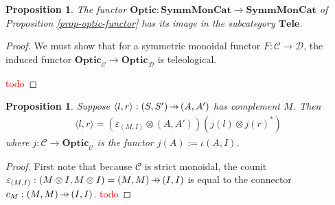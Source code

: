 \documentclass[11pt,a4paper]{article}
\theoremstyle{plain}
\newtheorem{proposition}[theorem]{Proposition}
\theoremstyle{definition}
\newcommand{\C}{\mathscr{C}}
\newcommand{\D}{\mathscr{D}}
\newcommand{\SymmMonCat}{\mathbf{SymmMonCat}}
\newcommand{\Tele}{\mathbf{Tele}}
\newcommand{\Optic}{\mathbf{Optic}}
\newcommand{\hto}{\ensuremath{\,\mathaccent\shortmid\rightarrow\,}}
\newcommand{\todo}[1]{\textcolor{red}{\small #1}}
\begin{document}

\begin{proposition}
The functor $\Optic : \SymmMonCat \to \SymmMonCat$ of Proposition \ref{prop-optic-functor} has its image in the subcategory $\Tele$.
\end{proposition}
\begin{proof}
We must show that for a symmetric monoidal functor $F : \C \to \D$, the induced functor $\Optic_\C \to \Optic_\D$ is teleological.

\todo{todo}
\end{proof}

%
%
%

\begin{proposition}
\label{prop-optic-decompose}
Suppose $\langle l, r \rangle : (S, S') \hto (A, A')$ has complement $M$. Then 
\begin{align*}
\langle l, r \rangle = (\varepsilon_{(M, I)} \otimes (A, A'))(j(l) \otimes j(r)^*)
\end{align*}
where $j : \C \to \Optic_\C$ is the functor $j(A) := \iota(A, I)$.
\end{proposition}
\begin{proof}
First note that because $\C$ is strict monoidal, the counit $\varepsilon_{(M, I)} : (M \otimes I, M \otimes I) = (M, M) \hto (I, I)$ is equal to the connector $c_M : (M, M) \hto (I, I)$.
\todo{todo}
\end{proof}
\end{document}
